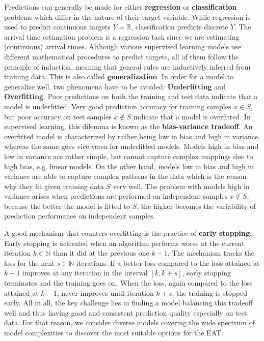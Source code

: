 Predictions can generally be made for either \textbf{regression} or \textbf{classification} problems which differ in the nature of their target variable. 
While regression is used to predict continuous targets $ Y = \mathbb{R} $, classification predicts discrete $ Y $. The arrival time estimation problem is a regression task since we are estimating (continuous) arrival times.
Although various supervised learning models use different mathematical procedures to predict targets, all of them follow the principle of induction, meaning that general rules are inductively inferred from training data. This is also called \textbf{generalization}.  
In order for a model to generalize well, two phenomena have to be avoided: \textbf{Underfitting} and \textbf{Overfitting}. 
Poor predictions on both the training and test data indicate that a model is underfitted. Very good prediction accuracy for training samples $ x \in S $, but poor accuracy on test samples $ x \notin S $ indicate that a model is overfitted.
In supervised learning, this dilemma is known as the \textbf{bias-variance tradeoff}. 
An overfitted model is characterized by rather being low in bias and high in variance, whereas the same goes vice versa for underfitted models. Models high in bias and low in variance are rather simple, but cannot capture complex mappings due to high bias, e.g. linear models. On the other hand, models low in bias and high in variance are able to capture complex patterns in the data which is the reason why they fit given training data $ S $ very well. The problem with models high in variance arises when predictions are performed on independent samples $ x \notin S $, because the better the model is fitted to $ S $, the higher becomes the variability of prediction performance on independent samples. 

A good mechanism that counters overfitting is the practice of \textbf{early stopping}. Early stopping is activated when an algorithm performs worse at the current iteration $ k \in \mathbb{N} $ than it did at the previous one $ k-1 $. The mechanism tracks the loss for the next $ s \in \mathbb{N} $ iterations. If a better loss compared to the loss attained at $ k-1 $ improves at any iteration in the interval $ [k, k+s] $, early stopping terminates and the training goes on. When the loss, again compared to the loss attained at $ k-1 $, never improves until iteration $ k+s $, the training is stopped early. 
All in all, the key challenge lies in finding a model balancing this tradeoff well and thus having good and consistent prediction quality especially on test data. For that reason, we consider diverse models covering the wide spectrum of model complexities to discover the most suitable options for the EAT. 
 

